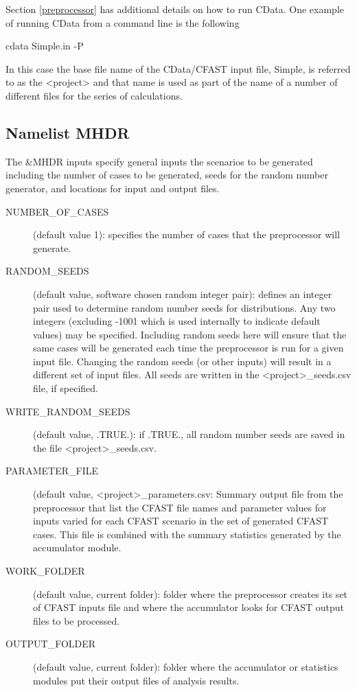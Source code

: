 \documentclass[12pt,twoside]{book}
\begin{document}
Section \ref{preprocessor} has additional details on how to run CData. One example of running CData from a command line is the following

\vspace{\baselineskip}
{\ct cdata Simple.in -P}
\vspace{\baselineskip}

In this case the base file name of the CData/CFAST input file, {\ct Simple}, is referred to as the {\ct <project>} and that name is used as part of the name of a number of different files for the series of calculations.

\subsection{Namelist MHDR}
\label{info:MHDR}

The {\ct \&MHDR} inputs specify general inputs the scenarios to be generated including the number of cases to be generated, seeds for the random number generator, and locations for input and output files.

\begin{description}
  \item[NUMBER\_OF\_CASES] (default value 1): specifies the number of cases that the preprocessor will generate.
  \item[RANDOM\_SEEDS] (default value, software chosen random integer pair): defines an integer pair used to determine random number seeds for distributions. Any two integers (excluding -1001 which is used internally to indicate default values) may be specified. Including random seeds here will ensure that the same cases will be generated each time the preprocessor is run for a given input file. Changing the random seeds (or other inputs) will result in a different set of input files.  All seeds are written in the {\ct <project>\_seeds.csv} file, if specified.
  \item[WRITE\_RANDOM\_SEEDS] (default value, .TRUE.): if .TRUE., all random number seeds are saved in the file {\ct <project>\_seeds.csv}.
  \item[PARAMETER\_FILE] (default value, {\ct <project>\_parameters.csv}: Summary output file from the preprocessor that list the CFAST file names and parameter values for inputs varied for each CFAST scenario in the set of generated CFAST cases. This file is combined with the summary statistics generated by the accumulator module.
  \item[WORK\_FOLDER] (default value, current folder): folder where the preprocessor creates its set of CFAST inputs file and where the accumulator looks for CFAST output files to be processed.
  \item[OUTPUT\_FOLDER] (default value, current folder): folder where the accumulator or statistics modules put their output files of analysis results.
\end{description}
\end{document}
